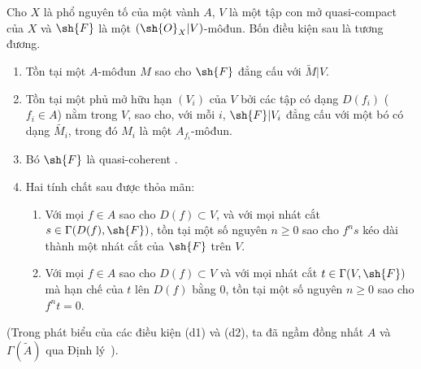 \documentclass[oneside]{amsart}
\renewcommand{\geq}{\geqslant}
\let\EGAOriginalLabel\label
\renewcommand{\label}[1]{\phantomsection\EGAOriginalLabel{#1}}
\begin{document}
\begin{theorem}[1.4.1]
\label{I.1.4.1}
Cho $X$ là phổ nguyên tố của một vành $A$, $V$ là một tập con mở quasi-compact của $X$ và $\sh{F}$ là một $(\sh{O}_X|V)$-môđun.
Bốn điều kiện sau là tương đương.
\begin{enumerate}
  \item[{\rm(a)}] Tồn tại một $A$-môđun $M$ sao cho $\sh{F}$ đẳng cấu với $\widetilde{M}|V$.
  \item[{\rm(b)}] Tồn tại một phủ mở hữu hạn $(V_i)$ của $V$ bởi các tập có dạng $D(f_i)$ ($f_i\in A$) nằm trong $V$, sao cho, với mỗi $i$, $\sh{F}|V_i$ đẳng cấu với một bó có dạng $\widetilde{M_i}$, trong đó $M_i$ là một $A_{f_i}$-môđun.
  \item[{\rm(c)}] Bó $\sh{F}$ là quasi-coherent .
  \item[{\rm(d)}] Hai tính chất sau được thỏa mãn:
    \begin{enumerate}
      \item[{\rm(d1)}] Với mọi $f\in A$ sao cho $D(f)\subset V$, và với mọi nhát cắt $s\in\Gamma(D(f),\sh{F})$, tồn tại một số nguyên $n\geq 0$ sao cho $f^n s$ kéo dài thành một nhát cắt của $\sh{F}$ trên $V$.
      \item[{\rm(d2)}] Với mọi $f\in A$ sao cho $D(f)\subset V$ và với mọi nhát cắt $t\in\Gamma(V,\sh{F})$ mà hạn chế của $t$ lên $D(f)$ bằng $0$, tồn tại một số nguyên $n\geq 0$ sao cho $f^n t=0$.
    \end{enumerate}
\end{enumerate}
\end{theorem}
(Trong phát biểu của các điều kiện (d1) và (d2), ta đã ngầm đồng nhất $A$ và $\Gamma(\widetilde{A})$ qua Định lý~).
\end{document}
